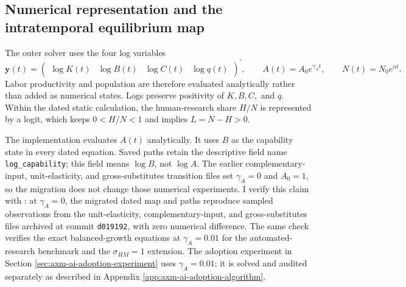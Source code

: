 \subsection{Numerical representation and the intratemporal equilibrium map}

The outer solver uses the four log variables
\begin{equation}
 \mathbf y(t)=
 \begin{pmatrix}\log K(t)&\log B(t)&\log C(t)&\log q(t)\end{pmatrix}^{\prime},
 \qquad A(t)=A_0e^{\gamma_At},\qquad N(t)=N_0e^{nt}.
 \label{eq:axm-numerical-state}
\end{equation}
Labor productivity and population are therefore evaluated analytically rather
than added as numerical states. Logs preserve positivity of \(K,B,C,\) and \(q\). Within the
dated static calculation, the human-research share \(H/N\) is represented by a
logit, which keeps \(0<H/N<1\) and implies \(L=N-H>0\).

The implementation evaluates \(A(t)\) analytically. It uses \(B\) as the
capability state in every dated equation. Saved paths retain the descriptive
field name \texttt{log\_capability}; this field means
\(\log B\), not \(\log A\). The earlier complementary-input,
unit-elasticity, and gross-substitutes transition files set \(\gamma_A=0\) and
\(A_0=1\), so the migration does not change those numerical experiments. I
verify this claim with : at
\(\gamma_A=0\), the
migrated dated map and paths reproduce sampled observations from the
unit-elasticity, complementary-input, and gross-substitutes files archived at
commit \texttt{d019192}, with zero numerical difference.
The same check verifies the exact balanced-growth equations at
\(\gamma_A=0.01\) for the automated-research benchmark and the
\(\sigma_{HM}=1\) extension. The adoption experiment in Section
\ref{sec:axm-ai-adoption-experiment} uses \(\gamma_A=0.01\); it is solved and
audited separately as described in Appendix
\ref{app:axm-ai-adoption-algorithm}.

